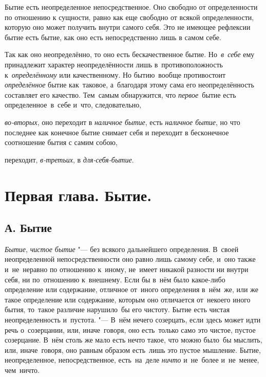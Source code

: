 \clearpage

Бытие есть неопределенное непосредственное. Оно свободно от определенности
по отношению к сущности, равно как еще свободно от всякой определенности,
которую оно может получить внутри самого себя. Это не имеющее рефлексии
бытие есть бытие, как оно есть непосредственно лишь в самом себе.

Так как оно неопределённо, то оно есть бескачественное бытие.
Но~{\em в~себе} ему принадлежит характер неопределённости
лишь в~противоположность к~{\em определённому} или
качественному. Но бытию~вообще противостоит
{\em определённое} бытие как~таковое, а~благодаря этому
сама его неопределённость составляет его качество. Тем~самым
обнаружится, что {\em первое}~бытие есть определенное~в~себе
и~что, следовательно,

{\em во-вторых}, оно переходит в
{\em наличное бытие}, есть
{\em наличное бытие}, но что последнее как конечное
бытие снимает себя и переходит в бесконечное
соотношение бытия с самим собою,

переходит, {\em в-третьих}, в {\em для-себя-бытие}.

\chapter[{\em Первая глава} Бытие]{Первая глава. Бытие.}
\section[А. Бытие]{А. Бытие}

{\em Бытие}, {\em чистое бытие} "--- без всякого дальнейшего определения.
В~своей неопределенной непосредственности оно равно лишь
самому себе, и~оно также и~не~неравно по отношению к~иному, не~имеет
никакой разности ни внутри себя, ни по~отношению к~внешнему. Если бы
в~нём было какое-либо определение или
содержание, отличное от~иного определения в~нём~же, или же такое
определение или содержание, которым оно отличается от~некоего иного
бытия, то~такое различие нарушило~бы его чистоту. Бытие есть чистая
неопределенность и~пустота. "--- В~нём нечего созерцать, если здесь
может идти речь о~созерцании, или, иначе~говоря, оно есть~только само
это чистое, пустое созерцание.
В~нём столь же мало есть нечто такое, что можно было~бы
мыслить, или, иначе~говоря, оно равным образом есть~лишь это пустое
мышление. Бытие, неопределенное, непосредственное, есть~на~деле
{\em ничто} и~не~более и~не~менее, чем~ничто.

